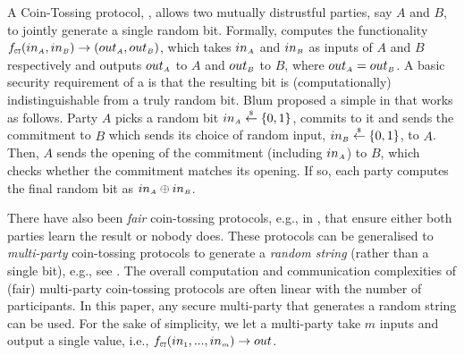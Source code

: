 A Coin-Tossing protocol, \ct, allows two mutually distrustful parties, say $A$ and $B$, to jointly generate a single random bit. Formally, \ct computes the functionality $f_{\scriptscriptstyle \mathtt{CT}}(in_{\scriptscriptstyle A}, in_{\scriptscriptstyle B})\rightarrow (out_{\scriptscriptstyle A}, out_{\scriptscriptstyle B})$, which takes $in_{\scriptscriptstyle A}$ and  $in_{\scriptscriptstyle B}$ as inputs of $A$ and $B$ respectively and outputs $out_{\scriptscriptstyle A}$ to $A$ and $out_{\scriptscriptstyle B}$ to $B$, where $out_{\scriptscriptstyle A}=out_{\scriptscriptstyle B}$. A basic security requirement of a \ct is that the resulting bit is (computationally) indistinguishable from a truly random bit. Blum proposed a simple \ct in \cite{Blum82} that works as follows. Party $A$ picks a random bit $in_{\scriptscriptstyle A}\stackrel{\scriptscriptstyle \$}\leftarrow\{0,1\}$, commits to it and sends the commitment to $B$ which sends its choice of random input, $in_{\scriptscriptstyle B}\stackrel{\scriptscriptstyle \$}\leftarrow\{0,1\}$, to $A$. Then, $A$ sends the opening of the commitment (including $in_{\scriptscriptstyle A}$) to $B$, which checks whether the commitment matches its opening. If so, each party computes the final random bit as $in_{\scriptscriptstyle A}\oplus in_{\scriptscriptstyle B}$.  

There have also been \emph{fair} coin-tossing protocols, e.g., in \cite{MoranNS09}, that ensure either both parties learn the result or nobody does. These protocols can be generalised to \emph{multi-party} coin-tossing protocols to generate a \emph{random string} (rather than a single bit), e.g., see \cite{BeimelOO10,KiayiasRDO17}.
%
The overall computation and communication complexities of (fair) multi-party coin-tossing protocols are often linear with the number of participants. In this paper, any secure multi-party \ct that generates a random string can be used. For the sake of simplicity, we let a multi-party \fct take $m$ inputs and output a single value, i.e., $f_{\scriptscriptstyle \mathtt{CT}}(in_{\scriptscriptstyle 1}, ..., in_{\scriptscriptstyle m})\rightarrow out$. 









